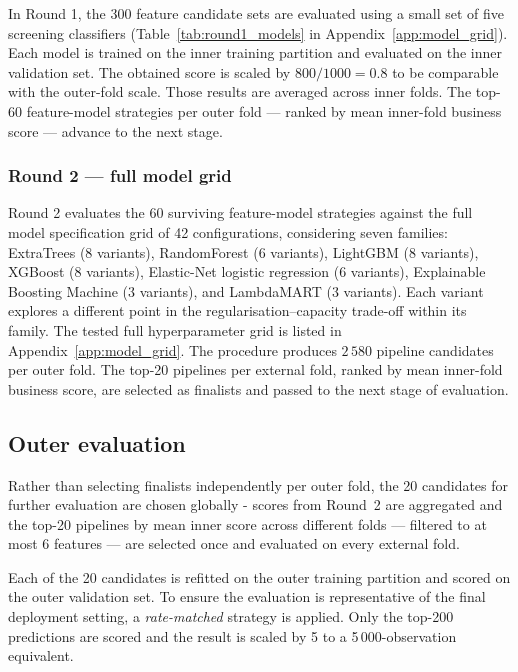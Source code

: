 \documentclass[cameraready]{Interspeech}
\begin{document}
In Round 1, the 300 feature candidate sets are evaluated using a small set of five screening
classifiers (Table~\ref{tab:round1_models} in Appendix~\ref{app:model_grid}).
Each model is trained on the inner training partition and evaluated on the inner validation
set. The obtained score is scaled by $800/1000 = 0.8$ to be comparable with
the outer-fold scale. Those results are averaged across inner folds. The top-60 feature-model strategies
per outer fold --- ranked by mean inner-fold business score --- advance to the next stage.

\subsubsection{Round 2 --- full model grid}

Round 2 evaluates the 60 surviving feature-model strategies against the full model specification grid
of 42 configurations, considering seven families: ExtraTrees (8 variants), RandomForest
(6 variants), LightGBM (8 variants), XGBoost (8 variants), Elastic-Net logistic
regression (6 variants), Explainable Boosting Machine (3 variants), and LambdaMART
(3 variants). Each variant explores a different point in the regularisation--capacity trade-off within its
family. The tested full hyperparameter grid is listed in Appendix~\ref{app:model_grid}.
The procedure produces $2\,580$ pipeline candidates per outer fold.
The top-20 pipelines per external fold, ranked by mean inner-fold business score, are selected
as finalists and passed to the next stage of evaluation.

\subsection{Outer evaluation}
\label{sec:outer}

Rather than selecting finalists independently per outer fold, the 20 candidates for further
evaluation are chosen globally - scores from Round~2 are aggregated and the top-20 pipelines by mean inner score across different folds --- filtered to at most 6
features --- are selected once and evaluated on every external fold.

Each of the 20 candidates is refitted on the outer training partition
and scored on the outer validation set.
To ensure the evaluation is representative of the final deployment setting, a
\emph{rate-matched} strategy is applied. Only the top-200 predictions are scored
and the result is scaled by 5 to a 5\,000-observation equivalent.
\end{document}
